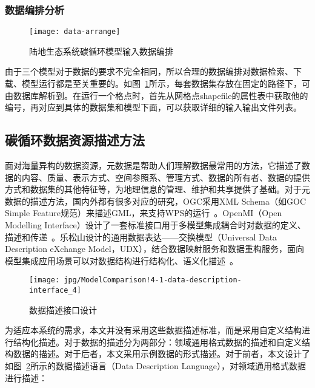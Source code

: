 \subsubsection{数据编排分析}
\label{subsubsec:data-arrange}
\begin{figure}[!htbp]
    \centering
    \texttt{[image: data-arrange]}
    \caption{陆地生态系统碳循环模型输入数据编排}
    \label{fig:data-arrange}
\end{figure}

由于三个模型对于数据的要求不完全相同，所以合理的数据编排对数据检索、下载、模型运行都是至关重要的。如图~\ref{fig:data-arrange}所示，每套数据集存放在固定的路径下，可由数据库解析到。在运行一个格点时，首先从网格点shapefile的属性表中获取他的编号，再对应到具体的数据集和模型下面，可以获取详细的输入输出文件列表。

\subsection{碳循环数据资源描述方法}
\label{sec:data-desc}
面对海量异构的数据资源，元数据是帮助人们理解数据最常用的方法，它描述了数据的内容、质量、表示方式、空间参照系、管理方式、数据的所有者、数据的提供方式和数据集的其他特征等，为地理信息的管理、维护和共享提供了基础。对于元数据的描述方法，国内外都有很多对应的研究，OGC采用XML Schema（如GOC Simple Feature规范）来描述GML，来支持WPS的运行~\cite{OGC-WPS}。OpenMI（Open Modelling Interface）设计了一套标准接口用于多模型集成耦合时对数据的定义、描述和传递~\cite{MOORE2005279}。乐松山设计的通用数据表达——交换模型（Universal Data Description eXchange Model，UDX），结合数据映射服务和数据重构服务，面向模型集成应用场景可以对数据结构进行结构化、语义化描述~\cite{乐松山2016面向地理模型共享与集成的数据适配方法研究}。

\begin{figure}[!htbp]
    \centering
    \texttt{[image: jpg/ModelComparison!4-1-data-description-interface\_4]}
    \caption{数据描述接口设计}
    \label{fig:ModelComparison!4-1-data-description-interface_4}
\end{figure}

为适应本系统的需求，本文并没有采用这些数据描述标准，而是采用自定义结构进行结构化描述。对于数据的描述分为两部分：领域通用格式数据的描述和自定义结构数据的描述。对于后者，本文采用示例数据的形式描述。对于前者，本文设计了如图~\ref{fig:ModelComparison!4-1-data-description-interface_4}所示的数据描述语言（Data Description Language），对领域通用格式数据进行描述：

